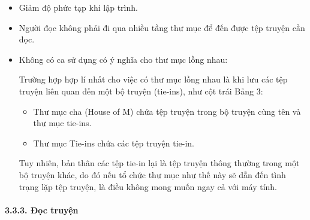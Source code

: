 \begin{itemize}
  \item
        Giảm độ phức tạp khi lập trình.
  \item
        Người đọc không phải đi qua nhiều tầng thư mục để đến được tệp truyện
        cần đọc.
  \item
        Không có ca sử dụng có ý nghĩa cho thư mục lồng nhau:

        Trường hợp hợp lí nhất cho việc có thư mục lồng nhau là khi lưu các
        tệp truyện liên quan đến một bộ truyện (tie-ins), như cột trái Bảng 3:

        \begin{itemize}
          
          \item
                Thư mục cha (House of M) chứa tệp truyện trong bộ truyện cùng tên và
                thư mục tie-ins.
          \item
                Thư mục Tie-ins chứa các tệp truyện tie-in.
        \end{itemize}

        Tuy nhiên, bản thân các tệp tie-in lại là tệp truyện thông thường
        trong một bộ truyện khác, do đó nếu tổ chức thư mục như thế này sẽ dẫn
        đến tình trạng lặp tệp truyện, là điều không mong muốn ngay cả với máy
        tính.
\end{itemize}

\hypertarget{ux111ux1ecdc-truyux1ec7n}{%
  \paragraph{\texorpdfstring{3.3.3. Đọc truyện
    }{3.3.3. Đọc truyện }}\label{ux111ux1ecdc-truyux1ec7n}}

